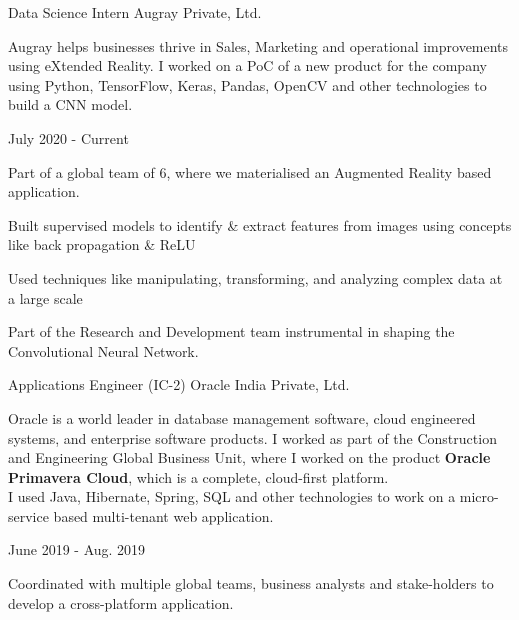 \begin{cventries}
  \cvexperience
    {Data Science Intern}
    {Augray Private, Ltd.}
    {}
    {
    \begin{cvitems}
    \hspace{-2ex}
        Augray helps businesses thrive in Sales, Marketing and operational improvements using eXtended Reality. I worked on a PoC of a new product for the company using Python, TensorFlow, Keras, Pandas, OpenCV and other technologies to build a CNN model.
    \end{cvitems}
    \vspace{-2ex}
    }
    {July 2020 - Current}
    {
      \begin{cvitems}
        \item {Part of a global team of 6, where we materialised an Augmented Reality based application.}
        \item {Built supervised models to identify \& extract features from images using concepts like back propagation \& ReLU}
        \item {Used techniques like manipulating, transforming, and analyzing complex data at a large scale}
        \item {Part of the Research and Development team instrumental in shaping the Convolutional Neural Network.}
      \end{cvitems}
    }
  \cvexperience
    {Applications Engineer (IC-2)}
    {Oracle India Private, Ltd.}
    {}
    {
    \begin{cvitems}
    \hspace{-2ex}
        Oracle is a world leader in database management software, cloud engineered systems, and enterprise software products. I worked as part of the Construction and Engineering Global Business Unit, where I worked on the product \textbf{Oracle Primavera Cloud}, which is a complete, cloud-first platform.\\
        I used Java, Hibernate, Spring, SQL and other technologies to work on a micro-service based multi-tenant web application.
    \end{cvitems}
    \vspace{-2ex}
    }
    {June 2019 - Aug. 2019}
    {
      \begin{cvitems}
        \item {Coordinated with multiple global teams, business analysts and stake-holders to develop a cross-platform application.}

\end{cvitems}}
\end{cventries}
